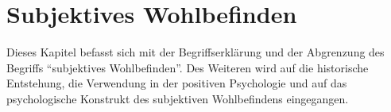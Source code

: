 %
%
\chapter{Subjektives Wohlbefinden}\label{chap.swb}
Dieses Kapitel befasst sich mit der Begriffserklärung und der Abgrenzung des Begriffs \textquotedblleft subjektives Wohlbefinden\textquotedblright. Des Weiteren wird auf die historische Entstehung, die Verwendung in der positiven Psychologie und auf das psychologische Konstrukt des subjektiven Wohlbefindens eingegangen.
